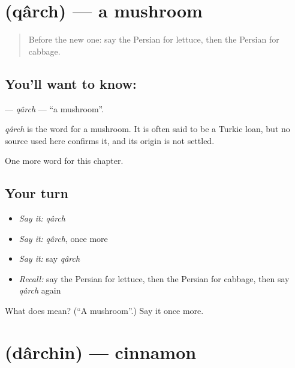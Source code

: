 \section[\texorpdfstring{\fa{قارچ} (qârch)}{قارچ (qârch)}]{ (qârch) — a mushroom}

\label{lesson:FA-C275-qarch}



\begin{quote}
Before the new one: say the Persian for lettuce, then the Persian for cabbage.
\end{quote}

\subsection*{You'll want to know: }
\textbf{} — \emph{qârch} — \textquotedblleft{}a mushroom\textquotedblright{}.

\begin{cousinweb}
\emph{qârch} is the word for a mushroom. It is often said to be a Turkic loan, but no source used here confirms it, and its origin is not settled.
\end{cousinweb}

\begin{grammarlens}[title={What you've built}]
One more word for this chapter.
\end{grammarlens}

\subsection*{Your turn}
\begin{itemize}
\raggedright
  \item \emph{Say it:} \emph{qârch}
  \item \emph{Say it:} \emph{qârch}, once more
  \item \emph{Say it:} say \emph{qârch}
  \item \emph{Recall:} say the Persian for lettuce, then the Persian for cabbage, then say \emph{qârch} again
\end{itemize}

\begin{tcolorbox}[breakable,colback=teal!4,colframe=teal!35!black,title={Before you move on}]
What does  mean? (\textquotedblleft{}A mushroom\textquotedblright{}.) Say it once more.
\end{tcolorbox}
\section[\texorpdfstring{\fa{دارچین} (dârchin)}{دارچین (dârchin)}]{ (dârchin) — cinnamon}


